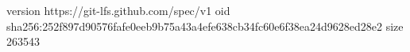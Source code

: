 version https://git-lfs.github.com/spec/v1
oid sha256:252f897d90576fafe0eeb9b75a43a4efe638cb34fc60e6f38ea24d9628ed28e2
size 263543
